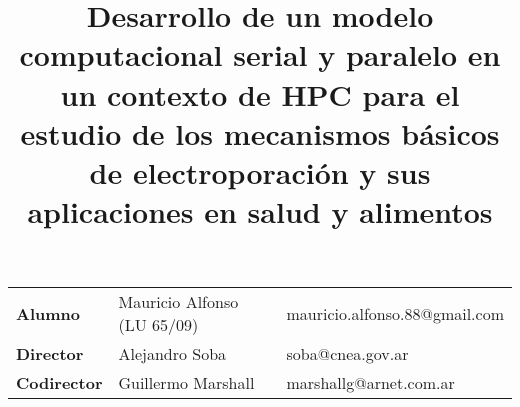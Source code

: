 \documentclass[a4paper,spanish]{article}
\title{Desarrollo de un modelo computacional serial y paralelo en un contexto de HPC para el estudio de los mecanismos básicos de electroporación y sus aplicaciones en salud y alimentos}
\author{}
\date{}
\begin{document}
\newcommand{\h}{\ce{H^+}}
\newcommand{\oh}{\ce{OH^-}}
\newcommand{\na}{\ce{Na^+}}
\newcommand{\cl}{\ce{Cl^-}}
\newcommand{\kvm}{$\si{\kilo\volt\per\metre}$}
\newcommand{\usec}{$\si{\micro\second}$}

\maketitle

\begin{table}[h!] \begin{center}
	\begin{tabular}{l  l  l}
				
		\textbf{Alumno} & Mauricio Alfonso (LU 65/09) & mauricio.alfonso.88@gmail.com\\
		\textbf{Director} & Alejandro Soba & soba@cnea.gov.ar\\
		\textbf{Codirector} & Guillermo Marshall & marshallg@arnet.com.ar\\
		
	\end{tabular}
	\end{center}
\end{table}
\end{document}
